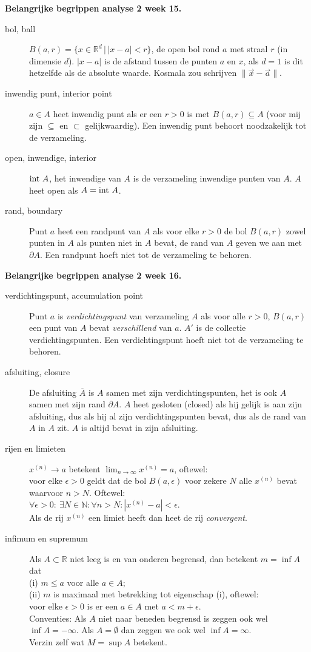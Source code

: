 {\bf Belangrijke begrippen analyse 2 week 15.}
\vskip 8pt
\begin{description}
\item[bol, ball] $B(a,r)=\{x\in \mathbb R^d\,|\,|x-a|<r\}$, de open bol rond $a$ met
straal $r$ (in dimensie $d$). $|x-a|$ is de afstand tussen de punten $a$ en $x$,
als $d=1$ is dit hetzelfde als de absolute waarde. Kosmala zou schrijven
$\|\vec x-\vec a\|$.
\item[inwendig punt, interior point] $a\in A$ heet inwendig punt als er een $r>0$ is
met $B(a,r)\subseteq A$ (voor mij zijn $\subseteq$ en $\subset$ gelijkwaardig). Een
inwendig punt behoort noodzakelijk tot de verzameling.
\item[open, inwendige, interior]
$\mbox{int}~A$, het inwendige van $A$ is de verzameling inwendige punten van $A$. 
$A$ heet open als
$A=\mbox{int}~A$. 
\item[rand, boundary] Punt $a$ heet een randpunt van $A$ als voor elke $r>0$ de bol $B(a,r)$
zowel punten in $A$ als punten niet in $A$ bevat, de rand van $A$ geven we aan met $\partial A$. 
Een randpunt hoeft niet tot de verzameling te behoren.  
\end{description}
{\bf Belangrijke begrippen analyse 2 week 16.}
\vskip 8pt
\begin{description}
\item[verdichtingspunt, accumulation point]
Punt $a$ is {\em verdichtingspunt} van verzameling $A$ als voor alle $r>0$, $B(a,r)$ een punt
van $A$ bevat {\em verschillend} van $a$. $A'$ is de collectie verdichtingspunten. Een 
verdichtingspunt hoeft niet tot de verzameling te behoren.
\item[afsluiting, closure]
De afsluiting $\overline A$ is $A$ samen met zijn verdichtingspunten, het is ook $A$ samen
met zijn rand $\partial A$. $A$ heet gesloten (closed) als hij gelijk is aan zijn afsluiting, dus
als hij al zijn verdichtingspunten bevat, dus als de rand van $A$ in $A$ zit. $A$ is altijd bevat
in zijn afsluiting.
\item[rijen en limieten]
$x^{(n)}\to a$ betekent $\lim_{n\to\infty} x^{(n)}=a$, oftewel:\\ 
voor elke $\epsilon>0$ geldt dat de bol
$B(a,\epsilon)$ voor zekere $N$ alle $x^{(n)}$ bevat waarvoor $n>N$. Oftewel:\\
$\forall\epsilon>0: ~\exists N\in \mathbb N: \forall n>N: |x^{(n)}-a|<\epsilon$. \\
Als de rij $x^{(n)}$ een limiet heeft dan heet de rij {\em convergent}.
\item[infimum en supremum]
Als $A\subset \mathbb R$ niet leeg is en van onderen begrensd, 
dan betekent $m=\inf A$ dat \\
(i) $m\le a$ voor alle $a\in A$; \\
(ii) $m$ is maximaal met betrekking tot eigenschap (i), 
oftewel:\\ 
voor elke $\epsilon>0$ is er een $a\in A$ met $a<m+\epsilon$.\\
Conventies: Als $A$ niet naar beneden begrensd is zeggen ook wel
$\inf A=-\infty$. Als $A=\emptyset$ dan zeggen we ook wel
$\inf A=\infty$.\\ 
Verzin zelf wat $M=\sup A$ betekent.
\end{description}

